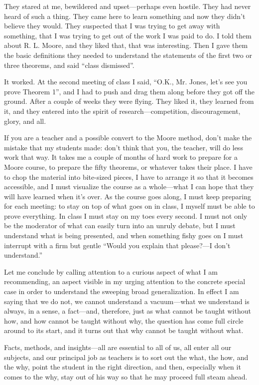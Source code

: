 \documentclass[a4paper,12pt]{article}
\begin{document}
They stared at me, bewildered and upset—perhaps even hostile.  They had
never heard of such a thing.  They came here to learn something and now
they didn’t believe they would.  They suspected that I was trying to get
away with something, that I was trying to get out of the work I was paid
to do.  I told them about R. L. Moore, and they liked that, that was
interesting.  Then I gave them the basic definitions they needed to
understand the statements of the first two or three theorems, and said
“class dismissed”.

It worked.  At the second meeting of class I said, “O.K., Mr. Jones,
let’s see you prove Theorem 1”, and I had to push and drag them along
before they got off the ground.  After a couple of weeks they were
flying.  They liked it, they learned from it, and they entered into
the spirit of research—competition, discouragement, glory, and all.

If you are a teacher and a possible convert to the Moore method, don’t
make the mistake that my students made: don’t think that you, the teacher,
will do less work that way.  It takes me a couple of months of hard work
to prepare for a Moore course, to prepare the fifty theorems, or whatever
takes their place.  I have to chop the material into bite-sized pieces, I
have to arrange it so that it becomes accessible, and I must visualize the
course as a whole—what I can hope that they will have learned when it’s
over.  As the course goes along, I must keep preparing for each meeting:
to stay on top of what goes on in class, I myself must be able to prove
everything.  In class I must stay on my toes every second.  I must not
only be the moderator of what can easily turn into an unruly debate, but I
must understand what is being presented, and when something fishy goes on
I must interrupt with a firm but gentle “Would you explain that please?—I
don’t understand.”

Let me conclude by calling attention to a curious aspect of what I am
recommending, an aspect visible in my urging attention to the concrete
special case in order to understand the sweeping broad generalization.
In effect I am saying that we do not, we cannot understand a vacuum—what
we understand is always, in a sense, a fact—and, therefore, just as what
cannot be taught without how, and how cannot be taught without why, the
question has come full circle around to its start, and it turns out that
why cannot be taught without what.

Facts, methods, and insights—all are essential to all of us, all enter all
our subjects, and our principal job as teachers is to sort out the what,
the how, and the why, point the student in the right direction, and then,
especially when it comes to the why, stay out of his way so that he may
proceed full steam ahead.
\end{document}
